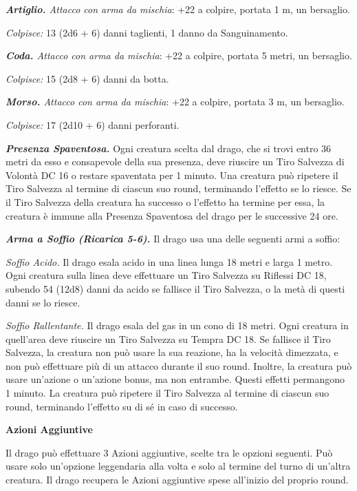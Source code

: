 \begin{multicols}{2}
\textit{\textbf{Artiglio.} Attacco con arma da mischia}: +22 a colpire, portata 1 m, un bersaglio.

\textit{Colpisce:} 13 (2d6 + 6) danni taglienti, 1 danno da Sanguinamento.

\textit{\textbf{Coda.} Attacco con arma da mischia}: +22 a colpire, portata 5 metri, un bersaglio.

\textit{Colpisce:} 15 (2d8 + 6) danni da botta.

\textit{\textbf{Morso.} Attacco con arma da mischia}: +22 a colpire, portata 3 m, un bersaglio.

\textit{Colpisce:} 17 (2d10 + 6) danni perforanti.

\textit{\textbf{Presenza Spaventosa.}} Ogni creatura scelta dal drago, che si trovi entro 36 metri da esso e consapevole della sua presenza, deve riuscire un Tiro Salvezza di Volontà DC 16 o restare spaventata per 1 minuto. Una creatura può ripetere il Tiro Salvezza al termine di ciascun suo round, terminando l'effetto se lo riesce. Se il Tiro Salvezza della creatura ha successo o l'effetto ha termine per essa, la creatura è immune alla Presenza Spaventosa del drago per le successive 24 ore.

\textit{\textbf{Arma a Soffio (Ricarica 5-6).}} Il drago usa una delle seguenti armi a soffio:

\textit{Soffio Acido.} Il drago esala acido in una linea lunga 18 metri e larga 1 metro. Ogni creatura sulla linea deve effettuare un Tiro Salvezza su Riflessi DC 18, subendo 54 (12d8) danni da acido se fallisce il Tiro Salvezza, o la metà di questi danni se lo riesce.

\textit{Soffio Rallentante.} Il drago esala del gas in un cono di 18 metri. Ogni creatura in quell'area deve riuscire un Tiro Salvezza su Tempra DC 18. Se fallisce il Tiro Salvezza, la creatura non può usare la sua reazione, ha la velocità dimezzata, e non può effettuare più di un attacco durante il suo round. Inoltre, la creatura può usare un'azione o un'azione bonus, ma non entrambe. Questi effetti permangono 1 minuto. La creatura può ripetere il Tiro Salvezza al termine di ciascun suo round, terminando l'effetto su di sé in caso di successo.

\textbf{Azioni Aggiuntive}

Il drago può effettuare 3 Azioni aggiuntive, scelte tra le opzioni seguenti. Può usare solo un'opzione leggendaria alla volta e solo al termine del turno di un'altra creatura. Il drago recupera le Azioni aggiuntive spese all'inizio del proprio round.


\end{multicols}
